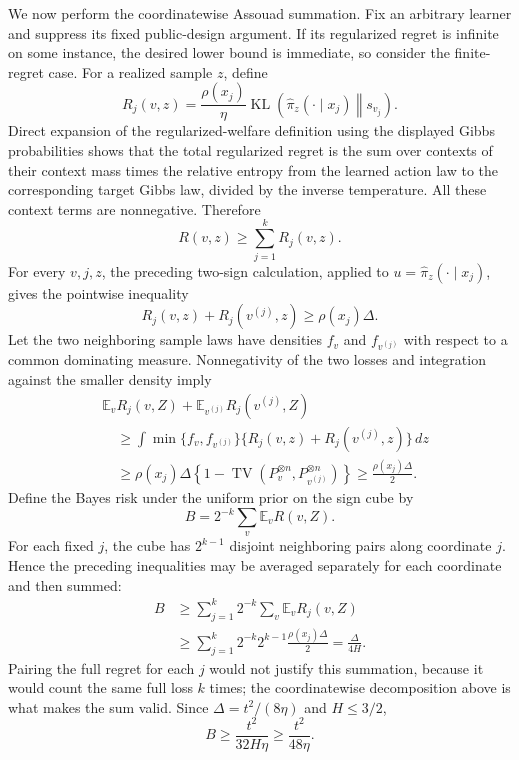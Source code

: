 We now perform the coordinatewise Assouad summation. Fix an arbitrary learner and suppress its fixed public-design argument. If its regularized regret is infinite on some instance, the desired lower bound is immediate, so consider the finite-regret case. For a realized sample \(z\), define
\[
R_j(v,z)=\frac{\rho(x_j)}{\eta}
\operatorname{KL}\!\left(\widehat\pi_z(\cdot\mid x_j)\middle\Vert s_{v_j}\right).
\]
Direct expansion of the regularized-welfare definition using the displayed Gibbs probabilities shows that the total regularized regret is the sum over contexts of their context mass times the relative entropy from the learned action law to the corresponding target Gibbs law, divided by the inverse temperature. All these context terms are nonnegative. Therefore
\[
R(v,z)\ge\sum_{j=1}^kR_j(v,z).
\]
For every \(v,j,z\), the preceding two-sign calculation, applied to \(u=\widehat\pi_z(\cdot\mid x_j)\), gives the pointwise inequality
\[
R_j(v,z)+R_j(v^{(j)},z)
\ge\rho(x_j)\Delta.
\]
Let the two neighboring sample laws have densities \(f_v\) and \(f_{v^{(j)}}\) with respect to a common dominating measure. Nonnegativity of the two losses and integration against the smaller density imply
\[
\begin{aligned}
&\mathbb E_v R_j(v,Z)+\mathbb E_{v^{(j)}}R_j(v^{(j)},Z)\\
&\quad\ge
\int\min\{f_v,f_{v^{(j)}}\}
\{R_j(v,z)+R_j(v^{(j)},z)\}\,dz\\
&\quad\ge
\rho(x_j)\Delta
\left\{1-\operatorname{TV}\!\left(P_v^{\otimes n},P_{v^{(j)}}^{\otimes n}\right)\right\}
\ge\frac{\rho(x_j)\Delta}{2}.
\end{aligned}
\]
Define the Bayes risk under the uniform prior on the sign cube by
\[
B=2^{-k}\sum_v\mathbb E_vR(v,Z).
\]
For each fixed \(j\), the cube has \(2^{k-1}\) disjoint neighboring pairs along coordinate \(j\). Hence the preceding inequalities may be averaged separately for each coordinate and then summed:
\[
\begin{aligned}
B
&\ge\sum_{j=1}^k2^{-k}\sum_v\mathbb E_vR_j(v,Z)\\
&\ge\sum_{j=1}^k2^{-k}2^{k-1}\frac{\rho(x_j)\Delta}{2}
=\frac{\Delta}{4H}.
\end{aligned}
\]
Pairing the full regret for each \(j\) would not justify this summation, because it would count the same full loss \(k\) times; the coordinatewise decomposition above is what makes the sum valid. Since \(\Delta=t^2/(8\eta)\) and \(H\le3/2\),
\[
B\ge\frac{t^2}{32H\eta}
\ge\frac{t^2}{48\eta}.
\]

